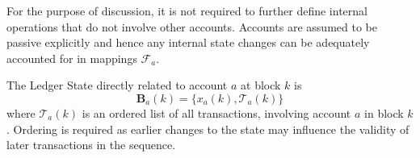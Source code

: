 \documentclass[letterpaper, 10 pt, conference]{ieeeconf}  %
\begin{document}


For the purpose of discussion, it is not required to further define internal operations that do not involve other accounts. Accounts are assumed to be passive explicitly and hence any internal state changes can be adequately accounted for in mappings $\mathcal{F}_a$. 

The Ledger State directly related to account $a$ at block $k$ is 
\begin{equation}
   \mathbf{B}_a(k) = \{x_a(k), \mathcal{T}_a(k)\} 
\end{equation}
where $\mathcal{T}_a(k)$ is an ordered list of all transactions, involving account $a$ in block $k$. Ordering is required as earlier changes to the state may  influence the validity of later transactions in the sequence.
\end{document}

